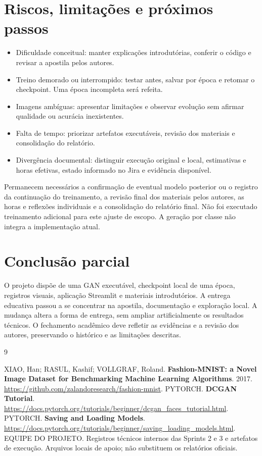 \documentclass[12pt,a4paper]{article}
\begin{document}
\section{Riscos, limitações e próximos passos}
\begin{itemize}
\item Dificuldade conceitual: manter explicações introdutórias, conferir o código e revisar a apostila pelos autores.
\item Treino demorado ou interrompido: testar antes, salvar por época e retomar o checkpoint. Uma época incompleta será refeita.
\item Imagens ambíguas: apresentar limitações e observar evolução sem afirmar qualidade ou acurácia inexistentes.
\item Falta de tempo: priorizar artefatos executáveis, revisão dos materiais e consolidação do relatório.
\item Divergência documental: distinguir execução original e local, estimativas e horas efetivas, estado informado no Jira e evidência disponível.
\end{itemize}
Permanecem necessários a confirmação de eventual modelo posterior ou o registro da continuação do treinamento, a revisão final dos materiais pelos autores, as horas e reflexões individuais e a consolidação do relatório final. Não foi executado treinamento adicional para este ajuste de escopo. A geração por classe não integra a implementação atual.

\section{Conclusão parcial}
O projeto dispõe de uma GAN executável, checkpoint local de uma época, registros visuais, aplicação Streamlit e materiais introdutórios. A entrega educativa passou a se concentrar na apostila, documentação e exploração local. A mudança altera a forma de entrega, sem ampliar artificialmente os resultados técnicos. O fechamento acadêmico deve refletir as evidências e a revisão dos autores, preservando o histórico e as limitações descritas.

\begin{thebibliography}{9}
 XIAO, Han; RASUL, Kashif; VOLLGRAF, Roland. \textbf{Fashion-MNIST: a Novel Image Dataset for Benchmarking Machine Learning Algorithms}. 2017. \url{https://github.com/zalandoresearch/fashion-mnist}.
 PYTORCH. \textbf{DCGAN Tutorial}. \url{https://docs.pytorch.org/tutorials/beginner/dcgan_faces_tutorial.html}.
 PYTORCH. \textbf{Saving and Loading Models}. \url{https://docs.pytorch.org/tutorials/beginner/saving_loading_models.html}.
 EQUIPE DO PROJETO. Registros técnicos internos das Sprints 2 e 3 e artefatos de execução. Arquivos locais de apoio; não substituem os relatórios oficiais.
\end{thebibliography}
\end{document}
